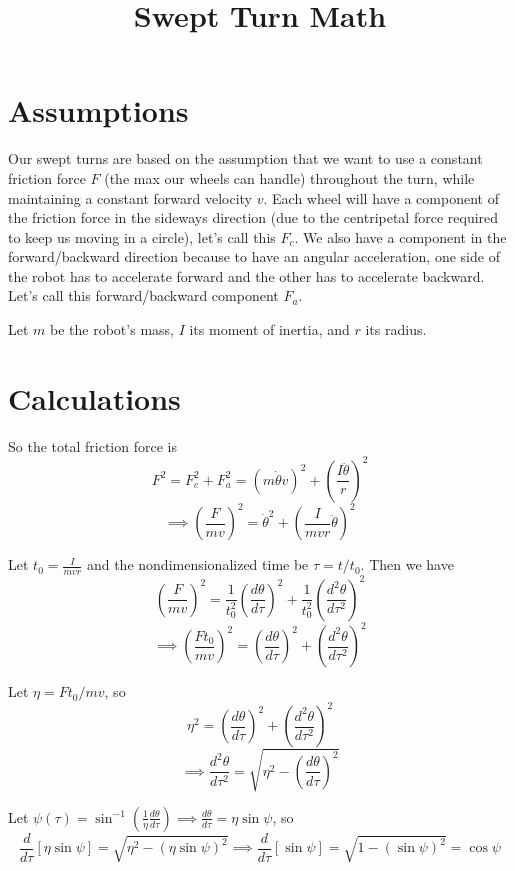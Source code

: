 \documentclass[12pt]{article}
\begin{document}
\title{Swept Turn Math}
\date{}
\maketitle

\section{Assumptions}
Our swept turns are based on the assumption that we want to use a constant friction force $F$ (the max our wheels can handle) throughout the turn, while maintaining a constant forward velocity $v$.  Each wheel will have a component of the friction force in the sideways direction (due to the centripetal force required to keep us moving in a circle), let's call this $F_c$.  We also have a component in the forward/backward direction because to have an angular acceleration, one side of the robot has to accelerate forward and the other has to accelerate backward.  Let's call this forward/backward component $F_a$.

Let $m$ be the robot's mass, $I$ its moment of inertia, and $r$ its radius.

\section{Calculations}
So the total friction force is
$$ F^2 = F_c^2 + F_a^2 = \left( m \dot{\theta} v \right)^2 + \left( \frac{I \ddot{\theta}}{r} \right)^2 $$
$$ \implies \left( \frac{F}{m v} \right)^2 = \dot{\theta}^2 + \left( \frac{I}{m v r} \ddot{\theta} \right)^2 $$

Let $t_0 = \frac{I}{m v r}$ and the nondimensionalized time be $\tau = t/t_0$. Then we have
$$ \left( \frac{F}{m v} \right)^2 = \frac{1}{t_0^2} \left( \frac{d \theta}{d \tau} \right)^2 + \frac{1}{t_0^2} \left( \frac{d^2 \theta}{d \tau^2} \right)^2 $$
$$ \implies \left( \frac{F t_0}{m v} \right)^2 = \left( \frac{d \theta}{d \tau} \right)^2 + \left( \frac{d^2 \theta}{d \tau^2} \right)^2 $$

Let $\eta = F t_0 / m v$, so
$$ \eta^2 = \left( \frac{d \theta}{d \tau} \right)^2 + \left( \frac{d^2 \theta}{d \tau^2} \right)^2 $$
$$ \implies \frac{d^2 \theta}{d \tau^2} = \sqrt{\eta^2 - \left( \frac{d \theta}{d \tau} \right)^2} $$

Let $ \psi(\tau) = \sin^{-1} \left( \frac{1}{\eta} \frac{d \theta}{d \tau} \right) \implies \frac{d \theta}{d \tau} = \eta \sin \psi$, so
$$ \frac{d}{d \tau} [\eta \sin \psi] = \sqrt{\eta^2 - \left( \eta \sin \psi \right)^2} \implies \frac{d}{d \tau} [\sin \psi] = \sqrt{1 - \left( \sin \psi \right)^2} = \cos \psi $$
\end{document}
